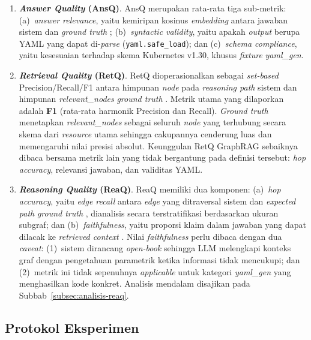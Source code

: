 \begin{enumerate}
    \item \textbf{\textit{Answer Quality} (AnsQ)}.
    AnsQ merupakan rata-rata tiga sub-metrik: (a)~\textit{answer relevance}, yaitu kemiripan kosinus \textit{embedding} antara jawaban sistem dan \textit{ground truth} \parencite{es_ragas_2023}; (b)~\textit{syntactic validity}, yaitu apakah \textit{output} berupa YAML yang dapat di-\textit{parse} (\texttt{yaml.safe\_load}); dan (c)~\textit{schema compliance}, yaitu kesesuaian terhadap skema Kubernetes v1.30, khusus \textit{fixture} \textit{yaml\_gen}.

    \item \textbf{\textit{Retrieval Quality} (RetQ)}.
    RetQ dioperasionalkan sebagai \textit{set-based} Precision/Recall/F1 antara himpunan \textit{node} pada \textit{reasoning path} sistem dan himpunan \textit{relevant\_nodes} \textit{ground truth} \parencite{manning_ir_2008}. Metrik utama yang dilaporkan adalah \textbf{F1} (rata-rata harmonik Precision dan Recall). \textit{Ground truth} menetapkan \textit{relevant\_nodes} sebagai seluruh \textit{node} yang terhubung secara skema dari \textit{resource} utama sehingga cakupannya cenderung luas dan memengaruhi nilai presisi absolut. Keunggulan RetQ GraphRAG sebaiknya dibaca bersama metrik lain yang tidak bergantung pada definisi tersebut: \textit{hop accuracy}, relevansi jawaban, dan validitas YAML.

    \item \textbf{\textit{Reasoning Quality} (ReaQ)}.
    ReaQ memiliki dua komponen: (a)~\textit{hop accuracy}, yaitu \textit{edge recall} antara \textit{edge} yang ditraversal sistem dan \textit{expected path} \textit{ground truth} \parencite{manning_ir_2008}, dianalisis secara terstratifikasi berdasarkan ukuran subgraf; dan (b)~\textit{faithfulness}, yaitu proporsi klaim dalam jawaban yang dapat dilacak ke \textit{retrieved context} \parencite{es_ragas_2023}. Nilai \textit{faithfulness} perlu dibaca dengan dua \textit{caveat}: (1)~sistem dirancang \textit{open-book} sehingga LLM melengkapi konteks graf dengan pengetahuan parametrik ketika informasi tidak mencukupi; dan (2)~metrik ini tidak sepenuhnya \textit{applicable} untuk kategori \textit{yaml\_gen} yang menghasilkan kode konkret. Analisis mendalam disajikan pada Subbab~\ref{subsec:analisis-reaq}.
\end{enumerate}

\subsection{Protokol Eksperimen}
\label{subsec:protokol-eksperimen}

